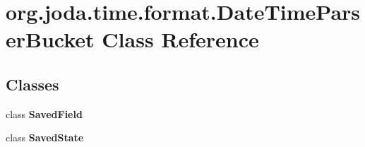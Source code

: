 \hypertarget{classorg_1_1joda_1_1time_1_1format_1_1_date_time_parser_bucket}{\section{org.\-joda.\-time.\-format.\-Date\-Time\-Parser\-Bucket Class Reference}
\label{classorg_1_1joda_1_1time_1_1format_1_1_date_time_parser_bucket}
}
\subsection*{Classes}
\begin{DoxyCompactItemize}
\item 
class {\bfseries Saved\-Field}
\item 
class {\bfseries Saved\-State}
\end{DoxyCompactItemize}
